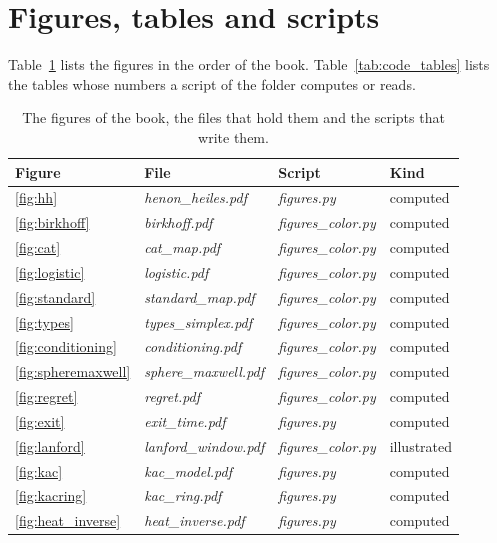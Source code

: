 \section{Figures, tables and scripts}
\label{sec:code_figures}

Table~\ref{tab:code_figures} lists the figures in the order of the book. Table~\ref{tab:code_tables} lists the tables whose numbers a script of the folder computes or reads.

\begin{table}[tp]\centering\footnotesize\setlength{\tabcolsep}{4pt}
\caption{The figures of the book, the files that hold them and the scripts that write them.}\label{tab:code_figures}
\begin{tabular}{llll}
\toprule
Figure & File & Script & Kind\\
\midrule
\ref{fig:hh} & \textit{henon\_heiles.pdf} & \textit{figures.py} & computed\\
\ref{fig:birkhoff} & \textit{birkhoff.pdf} & \textit{figures\_color.py} & computed\\
\ref{fig:cat} & \textit{cat\_map.pdf} & \textit{figures\_color.py} & computed\\
\ref{fig:logistic} & \textit{logistic.pdf} & \textit{figures\_color.py} & computed\\
\ref{fig:standard} & \textit{standard\_map.pdf} & \textit{figures\_color.py} & computed\\
\ref{fig:types} & \textit{types\_simplex.pdf} & \textit{figures\_color.py} & computed\\
\ref{fig:conditioning} & \textit{conditioning.pdf} & \textit{figures\_color.py} & computed\\
\ref{fig:spheremaxwell} & \textit{sphere\_maxwell.pdf} & \textit{figures\_color.py} & computed\\
\ref{fig:regret} & \textit{regret.pdf} & \textit{figures\_color.py} & computed\\
\ref{fig:exit} & \textit{exit\_time.pdf} & \textit{figures.py} & computed\\
\ref{fig:lanford} & \textit{lanford\_window.pdf} & \textit{figures\_color.py} & illustrated\\
\ref{fig:kac} & \textit{kac\_model.pdf} & \textit{figures.py} & computed\\
\ref{fig:kacring} & \textit{kac\_ring.pdf} & \textit{figures.py} & computed\\
\ref{fig:heat_inverse} & \textit{heat\_inverse.pdf} & \textit{figures.py} & computed\\

\end{tabular}
\end{table}
